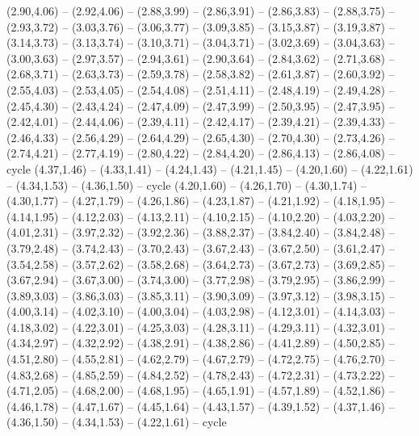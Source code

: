 \expandafter\def\csname geo:gebiet:LSO\endcsname{
  }
\expandafter\def\csname geo:gebiet:MEX\endcsname{
  (2.90,4.06) -- (2.92,4.06) -- (2.88,3.99) -- (2.86,3.91) -- (2.86,3.83) -- (2.88,3.75) -- (2.93,3.72) -- (3.03,3.76) -- (3.06,3.77) -- (3.09,3.85) -- (3.15,3.87) -- (3.19,3.87) -- (3.14,3.73) -- (3.13,3.74) -- (3.10,3.71) -- (3.04,3.71) -- (3.02,3.69) -- (3.04,3.63) -- (3.00,3.63) -- (2.97,3.57) -- (2.94,3.61) -- (2.90,3.64) -- (2.84,3.62) -- (2.71,3.68) -- (2.68,3.71) -- (2.63,3.73) -- (2.59,3.78) -- (2.58,3.82) -- (2.61,3.87) -- (2.60,3.92) -- (2.55,4.03) -- (2.53,4.05) -- (2.54,4.08) -- (2.51,4.11) -- (2.48,4.19) -- (2.49,4.28) -- (2.45,4.30) -- (2.43,4.24) -- (2.47,4.09) -- (2.47,3.99) -- (2.50,3.95) -- (2.47,3.95) -- (2.42,4.01) -- (2.44,4.06) -- (2.39,4.11) -- (2.42,4.17) -- (2.39,4.21) -- (2.39,4.33) -- (2.46,4.33) -- (2.56,4.29) -- (2.64,4.29) -- (2.65,4.30) -- (2.70,4.30) -- (2.73,4.26) -- (2.74,4.21) -- (2.77,4.19) -- (2.80,4.22) -- (2.84,4.20) -- (2.86,4.13) -- (2.86,4.08) -- cycle}
\expandafter\def\csname geo:gebiet:URY\endcsname{
  (4.37,1.46) -- (4.33,1.41) -- (4.24,1.43) -- (4.21,1.45) -- (4.20,1.60) -- (4.22,1.61) -- (4.34,1.53) -- (4.36,1.50) -- cycle}
\expandafter\def\csname geo:gebiet:BRA\endcsname{
  (4.20,1.60) -- (4.26,1.70) -- (4.30,1.74) -- (4.30,1.77) -- (4.27,1.79) -- (4.26,1.86) -- (4.23,1.87) -- (4.21,1.92) -- (4.18,1.95) -- (4.14,1.95) -- (4.12,2.03) -- (4.13,2.11) -- (4.10,2.15) -- (4.10,2.20) -- (4.03,2.20) -- (4.01,2.31) -- (3.97,2.32) -- (3.92,2.36) -- (3.88,2.37) -- (3.84,2.40) -- (3.84,2.48) -- (3.79,2.48) -- (3.74,2.43) -- (3.70,2.43) -- (3.67,2.43) -- (3.67,2.50) -- (3.61,2.47) -- (3.54,2.58) -- (3.57,2.62) -- (3.58,2.68) -- (3.64,2.73) -- (3.67,2.73) -- (3.69,2.85) -- (3.67,2.94) -- (3.67,3.00) -- (3.74,3.00) -- (3.77,2.98) -- (3.79,2.95) -- (3.86,2.99) -- (3.89,3.03) -- (3.86,3.03) -- (3.85,3.11) -- (3.90,3.09) -- (3.97,3.12) -- (3.98,3.15) -- (4.00,3.14) -- (4.02,3.10) -- (4.00,3.04) -- (4.03,2.98) -- (4.12,3.01) -- (4.14,3.03) -- (4.18,3.02) -- (4.22,3.01) -- (4.25,3.03) -- (4.28,3.11) -- (4.29,3.11) -- (4.32,3.01) -- (4.34,2.97) -- (4.32,2.92) -- (4.38,2.91) -- (4.38,2.86) -- (4.41,2.89) -- (4.50,2.85) -- (4.51,2.80) -- (4.55,2.81) -- (4.62,2.79) -- (4.67,2.79) -- (4.72,2.75) -- (4.76,2.70) -- (4.83,2.68) -- (4.85,2.59) -- (4.84,2.52) -- (4.78,2.43) -- (4.72,2.31) -- (4.73,2.22) -- (4.71,2.05) -- (4.68,2.00) -- (4.68,1.95) -- (4.65,1.91) -- (4.57,1.89) -- (4.52,1.86) -- (4.46,1.78) -- (4.47,1.67) -- (4.45,1.64) -- (4.43,1.57) -- (4.39,1.52) -- (4.37,1.46) -- (4.36,1.50) -- (4.34,1.53) -- (4.22,1.61) -- cycle}
